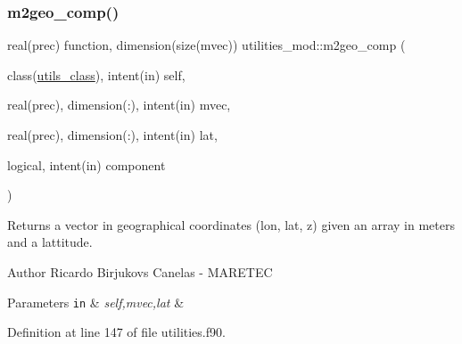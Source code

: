 \subsubsection{\texorpdfstring{m2geo\+\_\+comp()}{m2geo\_comp()}}
{\footnotesize\ttfamily real(prec) function, dimension(size(mvec)) utilities\+\_\+mod\+::m2geo\+\_\+comp (\begin{DoxyParamCaption}\item[{class(\mbox{\hyperlink{structutilities__mod_1_1utils__class}{utils\+\_\+class}}), intent(in)}]{self,  }\item[{real(prec), dimension(\+:), intent(in)}]{mvec,  }\item[{real(prec), dimension(\+:), intent(in)}]{lat,  }\item[{logical, intent(in)}]{component }\end{DoxyParamCaption})\hspace{0.3cm}{\ttfamily [private]}}



Returns a vector in geographical coordinates (lon, lat, z) given an array in meters and a lattitude. 

\begin{DoxyAuthor}{Author}
Ricardo Birjukovs Canelas -\/ M\+A\+R\+E\+T\+EC 
\end{DoxyAuthor}

\begin{DoxyParams}[1]{Parameters}
\mbox{\tt in}  & {\em self,mvec,lat} & \\
\hline
\end{DoxyParams}


Definition at line 147 of file utilities.\+f90.


